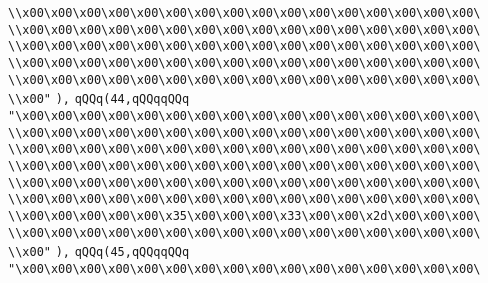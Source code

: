 \verb|\\x00\x00\x00\x00\x00\x00\x00\x00\x00\x00\x00\x00\x00\x00\x00\x00\|\newline
\verb|\\x00\x00\x00\x00\x00\x00\x00\x00\x00\x00\x00\x00\x00\x00\x00\x00\|\newline
\verb|\\x00\x00\x00\x00\x00\x00\x00\x00\x00\x00\x00\x00\x00\x00\x00\x00\|\newline
\verb|\\x00\x00\x00\x00\x00\x00\x00\x00\x00\x00\x00\x00\x00\x00\x00\x00\|\newline
\verb|\\x00\x00\x00\x00\x00\x00\x00\x00\x00\x00\x00\x00\x00\x00\x00\x00\|\newline
\verb|\\x00"|\newline
\verb|),|\newline
\verb|qQQq(44,qQQqqQQq|\newline
\verb|"\x00\x00\x00\x00\x00\x00\x00\x00\x00\x00\x00\x00\x00\x00\x00\x00\|\newline
\verb|\\x00\x00\x00\x00\x00\x00\x00\x00\x00\x00\x00\x00\x00\x00\x00\x00\|\newline
\verb|\\x00\x00\x00\x00\x00\x00\x00\x00\x00\x00\x00\x00\x00\x00\x00\x00\|\newline
\verb|\\x00\x00\x00\x00\x00\x00\x00\x00\x00\x00\x00\x00\x00\x00\x00\x00\|\newline
\verb|\\x00\x00\x00\x00\x00\x00\x00\x00\x00\x00\x00\x00\x00\x00\x00\x00\|\newline
\verb|\\x00\x00\x00\x00\x00\x00\x00\x00\x00\x00\x00\x00\x00\x00\x00\x00\|\newline
\verb|\\x00\x00\x00\x00\x00\x35\x00\x00\x00\x33\x00\x00\x2d\x00\x00\x00\|\newline
\verb|\\x00\x00\x00\x00\x00\x00\x00\x00\x00\x00\x00\x00\x00\x00\x00\x00\|\newline
\verb|\\x00"|\newline
\verb|),|\newline
\verb|qQQq(45,qQQqqQQq|\newline
\verb|"\x00\x00\x00\x00\x00\x00\x00\x00\x00\x00\x00\x00\x00\x00\x00\x00\|\newline
